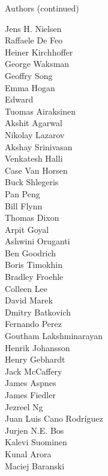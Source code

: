 \documentclass[xcolor=svgnames]{beamer}
\begin{document}
\begin{frame}{Authors (continued)}
  \begin{multicols}{5}
    \tiny

        Jens H. Nielsen\\
        Raffaele De Feo\\
        Heiner Kirchhoffer\\
        George Waksman\\
        Geoffry Song\\
        Emma Hogan\\
        Edward\\
        Tuomas Airaksinen\\
        Akshit Agarwal\\
        Nikolay Lazarov\\
        Akshay Srinivasan\\
        Venkatesh Halli\\
        Case Van Horsen\\
        Buck Shlegeris\\
        Pan Peng\\
        Bill Flynn\\
        Thomas Dixon\\
        Arpit Goyal\\
        Ashwini Oruganti\\
        Ben Goodrich\\
        Boris Timokhin\\
        Bradley Froehle\\
        Colleen Lee\\
        David Marek\\
        Dmitry Batkovich\\
        Fernando Perez\\
        Goutham Lakshminarayan\\
        Henrik Johansson\\
        Henry Gebhardt\\
        Jack McCaffery\\
        James Aspnes\\
        James Fiedler\\
        Jezreel Ng\\
        Juan Luis Cano Rodríguez\\
        Jurjen N.E. Bos\\
        Kalevi Suominen\\
        Kunal Arora\\
        Maciej Baranski\\

\end{multicols}
\end{frame}
\end{document}
